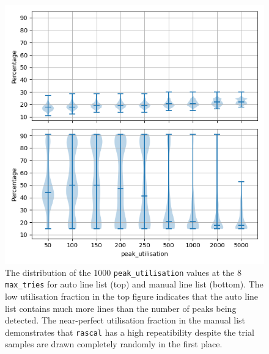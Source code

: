\documentclass{aa}
\begin{document}
\begin{figure}[h]
    \centering
    \includegraphics[width=\columnwidth]{plots/figure_4_peak_utilisation.png}
    \caption{The distribution of the 1000 \texttt{peak\_utilisation} values at the 8 \texttt{max\_tries} for auto line list (top) and manual line list (bottom). The low utilisation fraction in the top figure indicates that the auto line list contains much more lines than the number of peaks being detected. The near-perfect utilisation fraction in the manual list demonstrates that \texttt{rascal} has a high repeatibility despite the trial samples are drawn completely randomly in the first place.}
    \label{fig:peak_utilisation}
\end{figure}
\end{document}
